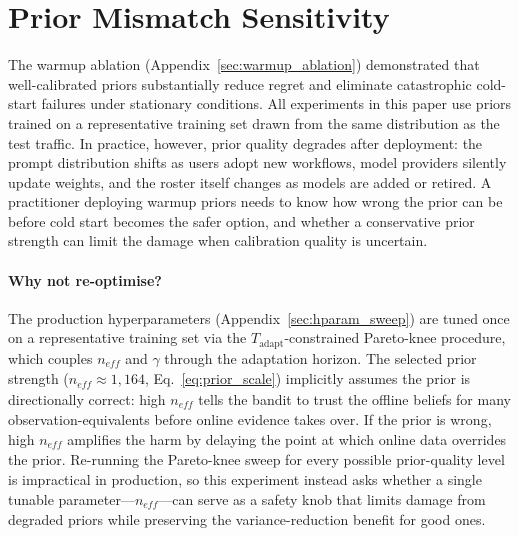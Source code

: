 
\section{Prior Mismatch Sensitivity}
\label{appendix:prior_mismatch}

The warmup ablation (Appendix~\ref{sec:warmup_ablation}) demonstrated
that well-calibrated priors substantially reduce regret and eliminate
catastrophic cold-start failures under stationary conditions.
All experiments in this paper use priors trained on a representative
training set drawn from the same distribution as the test traffic.
In practice, however, prior quality degrades after deployment:
the prompt distribution shifts as users adopt new workflows,
model providers silently update weights, and the roster itself
changes as models are added or retired.
A practitioner deploying warmup priors needs to know how wrong the
prior can be before cold start becomes the safer option, and whether
a conservative prior strength can limit the damage when calibration
quality is uncertain.

\paragraph{Why not re-optimise?}
The production hyperparameters (Appendix~\ref{sec:hparam_sweep})
are tuned once on a representative training set via the
$T_\text{adapt}$-constrained Pareto-knee procedure, which
couples $n_\mathit{eff}$ and $\gamma$ through the adaptation horizon.
The selected prior strength ($n_\mathit{eff} \approx 1{,}164$,
Eq.~\ref{eq:prior_scale}) implicitly assumes the prior is
directionally correct: high $n_\mathit{eff}$ tells the bandit to
trust the offline beliefs for many observation-equivalents before
online evidence takes over.
If the prior is wrong, high $n_\mathit{eff}$ amplifies the harm by
delaying the point at which online data overrides the prior.
Re-running the Pareto-knee sweep for every possible prior-quality
level is impractical in production, so this experiment instead
asks whether a single tunable parameter---$n_\mathit{eff}$---can
serve as a safety knob that limits damage from degraded priors
while preserving the variance-reduction benefit for good ones.

